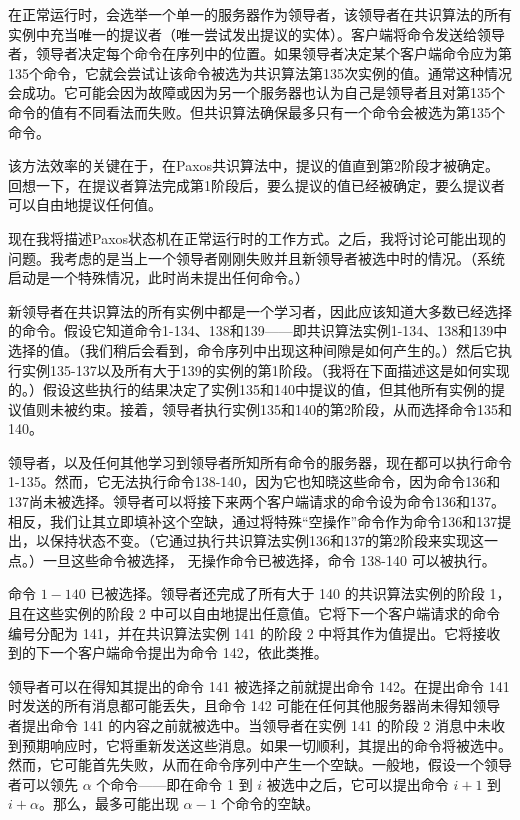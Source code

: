 \documentclass[12pt,a4paper]{report} %
\begin{document}
在正常运行时，会选举一个单一的服务器作为领导者，该领导者在共识算法的所有实例中充当唯一的提议者（唯一尝试发出提议的实体）。客户端将命令发送给领导者，领导者决定每个命令在序列中的位置。如果领导者决定某个客户端命令应为第135个命令，它就会尝试让该命令被选为共识算法第135次实例的值。通常这种情况会成功。它可能会因为故障或因为另一个服务器也认为自己是领导者且对第135个命令的值有不同看法而失败。但共识算法确保最多只有一个命令会被选为第135个命令。

该方法效率的关键在于，在Paxos共识算法中，提议的值直到第2阶段才被确定。回想一下，在提议者算法完成第1阶段后，要么提议的值已经被确定，要么提议者可以自由地提议任何值。

现在我将描述Paxos状态机在正常运行时的工作方式。之后，我将讨论可能出现的问题。我考虑的是当上一个领导者刚刚失败并且新领导者被选中时的情况。（系统启动是一个特殊情况，此时尚未提出任何命令。）

新领导者在共识算法的所有实例中都是一个学习者，因此应该知道大多数已经选择的命令。假设它知道命令1-134、138和139——即共识算法实例1-134、138和139中选择的值。（我们稍后会看到，命令序列中出现这种间隙是如何产生的。）然后它执行实例135-137以及所有大于139的实例的第1阶段。（我将在下面描述这是如何实现的。）假设这些执行的结果决定了实例135和140中提议的值，但其他所有实例的提议值则未被约束。接着，领导者执行实例135和140的第2阶段，从而选择命令135和140。

领导者，以及任何其他学习到领导者所知所有命令的服务器，现在都可以执行命令1-135。然而，它无法执行命令138-140，因为它也知晓这些命令，因为命令136和137尚未被选择。领导者可以将接下来两个客户端请求的命令设为命令136和137。相反，我们让其立即填补这个空缺，通过将特殊“空操作”命令作为命令136和137提出，以保持状态不变。（它通过执行共识算法实例136和137的第2阶段来实现这一点。）一旦这些命令被选择，
无操作命令已被选择，命令 138-140 可以被执行。

命令 $1-140$ 已被选择。领导者还完成了所有大于 140 的共识算法实例的阶段 1，且在这些实例的阶段 2 中可以自由地提出任意值。它将下一个客户端请求的命令编号分配为 141，并在共识算法实例 141 的阶段 2 中将其作为值提出。它将接收到的下一个客户端命令提出为命令 142，依此类推。

领导者可以在得知其提出的命令 141 被选择之前就提出命令 142。在提出命令 141 时发送的所有消息都可能丢失，且命令 142 可能在任何其他服务器尚未得知领导者提出命令 141 的内容之前就被选中。当领导者在实例 141 的阶段 2 消息中未收到预期响应时，它将重新发送这些消息。如果一切顺利，其提出的命令将被选中。然而，它可能首先失败，从而在命令序列中产生一个空缺。一般地，假设一个领导者可以领先 $\alpha$ 个命令——即在命令 1 到 $i$ 被选中之后，它可以提出命令 $i+1$ 到 $i+\alpha$。那么，最多可能出现 $\alpha-1$ 个命令的空缺。
\end{document}
